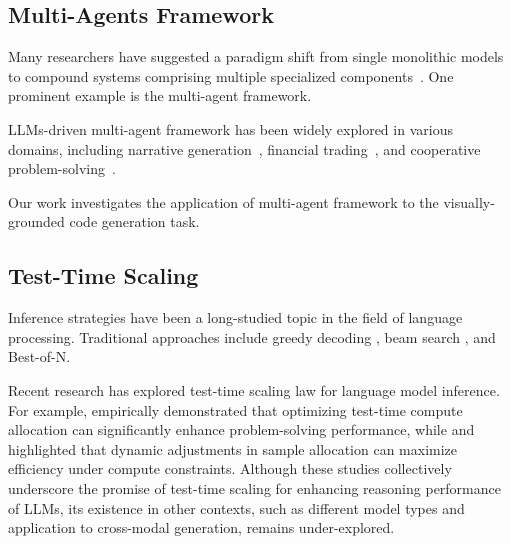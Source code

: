 \subsection{Multi-Agents Framework}

Many researchers have suggested a paradigm shift from single monolithic models to compound systems comprising multiple specialized components~\cite{compound-ai-blog, du2024compositional}. One prominent example is the multi-agent framework.

LLMs-driven multi-agent framework  has been widely explored in various domains, including narrative generation~\cite{huot2024agents}, financial trading~\cite{xiao2024tradingagents}, and cooperative problem-solving~\cite{du2023improving}.

Our work investigates the application of multi-agent framework to the visually-grounded code generation task.



\subsection{Test-Time Scaling} 

Inference strategies have been a long-studied topic in the field of language processing. Traditional approaches include greedy decoding \cite{teller2000speech}, beam search \cite{graves2012sequence}, and Best-of-N.

Recent research has explored test-time scaling law for language model inference. For example, \citet{wu2024inference} empirically demonstrated that optimizing test-time compute allocation can significantly enhance problem-solving performance, while \citet{zhang2024scaling} and \citet{snell2024scaling} highlighted that dynamic adjustments in sample allocation can maximize efficiency under compute constraints. Although these studies collectively underscore the promise of test-time scaling for enhancing reasoning performance of LLMs, its existence in other contexts, such as different model types and application to cross-modal generation,  remains under-explored. 
